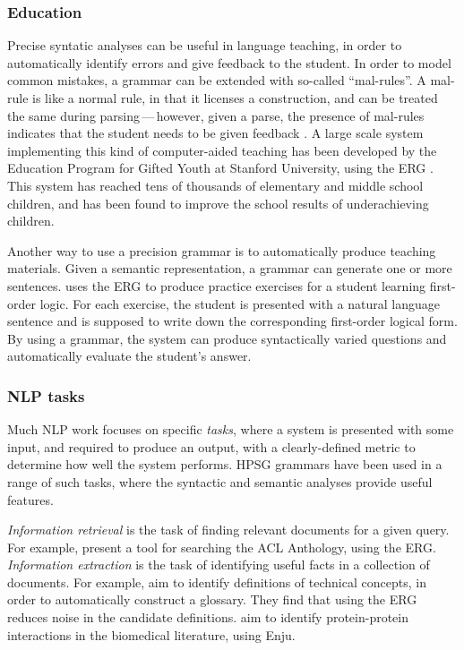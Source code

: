 \documentclass[output=paper,nonflat]{langsci/langscibook}
\begin{document}
\subsubsection{Education}
\label{cl:downstream:edu}

Precise syntatic analyses can be useful in language teaching,
in order to automatically identify errors and give feedback to the student.
In order to model common mistakes,
a grammar can be extended with so-called ``mal-rules''.
A mal-rule is like a normal rule, in that it licenses a construction,
and can be treated the same during parsing\,---\,however, given a parse,
the presence of mal-rules indicates that the student needs to be given feedback
\citep{Ben:Fli:Oep:04,flickinger2013error,morgadodacosta2016error}.
A large scale system implementing this kind of computer-aided teaching has been developed
by the Education Program for Gifted Youth at Stanford University,
using the ERG \citep{suppes2014teach}.
This system has reached tens of thousands of elementary and middle school children,
and has been found to improve the school results of underachieving children.

Another way to use a precision grammar is to automatically produce teaching materials.
Given a semantic representation,
a grammar can generate one or more sentences.
\citet{Flickinger:17} uses the ERG to produce practice exercises for a student learning first-order logic.
For each exercise, the student is presented with a natural language sentence
and is supposed to write down the corresponding first-order logical form.
By using a grammar, the system can produce syntactically varied questions
and automatically evaluate the student's answer.


\subsubsection{NLP tasks}
\label{cl:downstream:nlp}

Much NLP work focuses on specific \textit{tasks},
where a system is presented with some input,
and required to produce an output,
with a clearly-defined metric to determine how well the system performs.
HPSG grammars have been used in a range of such tasks,
where the syntactic and semantic analyses provide useful features.

\textit{Information retrieval} is the task of finding relevant documents for a given query.
For example, \citet{schaefer2011acl} present a tool for searching the ACL Anthology, using the ERG.
\textit{Information extraction} is the task of identifying useful facts in a collection of documents.
For example, \citet{reiplinger2012glossary} aim to identify definitions of technical concepts,
in order to automatically construct a glossary.
They find that using the ERG reduces noise in the candidate definitions.
\citet{miyao2008protein} aim to identify protein-protein interactions in the biomedical literature, using Enju.
\end{document}
